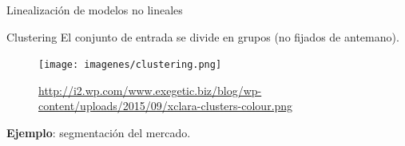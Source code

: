 \documentclass[hyperref={unicode}]{beamer}
\begin{document}
\begin{frame}{Linealización de modelos no lineales}
	\begin{table}[htbp!]
		\centering
		\caption{Linealización de distintos modelos}
		\label{tbl:linealizacion}
	\end{table} 
\end{frame}


\begin{frame}{Clustering}
	El conjunto de entrada se divide en grupos (no fijados de antemano).
	
	\begin{figure}
			\begin{center}
			\texttt{[image: imagenes/clustering.png]}
			\caption{\url{http://i2.wp.com/www.exegetic.biz/blog/wp-content/uploads/2015/09/xclara-clusters-colour.png}}
			\end{center}
	\end{figure}
			
	\textbf{Ejemplo}: segmentación del mercado. 
\end{frame}
\end{document}
